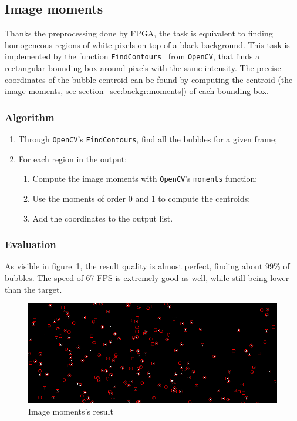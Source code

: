\subsection{Image moments}

Thanks the preprocessing done by FPGA, the \locate* task is equivalent to finding homogeneous regions of white pixels on top of a black background.
This task is implemented by the function \texttt{FindContours}~\cite{findcontours} from \texttt{OpenCV}, that finds a rectangular bounding box around pixels with the same intensity.
The precise coordinates of the bubble centroid can be found by computing the centroid (the image moments, see section~\ref{sec:backgr:moments}) of each bounding box.

\subsubsection{Algorithm}

\begin{enumerate}
	\itemsep 0em
	\item Through \texttt{OpenCV}'s \texttt{FindContours}, find all the bubbles for a given frame;
	\item For each region in the output:
	      \begin{enumerate}
		      \item Compute the image moments with \texttt{OpenCV}'s \texttt{moments} function;
		      \item Use the moments of order 0 and 1 to compute the centroids;
		      \item Add the coordinates to the output list.
	      \end{enumerate}
\end{enumerate}

\subsubsection{Evaluation}

As visible in figure~\ref{fig:locate:moments}, the result quality is almost perfect, finding about 99\% of bubbles.
The speed of 67 FPS is extremely good as well, while still being lower than the target.

\begin{figure}
	\centerline{\includegraphics[width=\locateimgsize]{images/locate/opencv moments.png}}
	\caption{\centering Image moments's result}
	\label{fig:locate:moments}
\end{figure}
